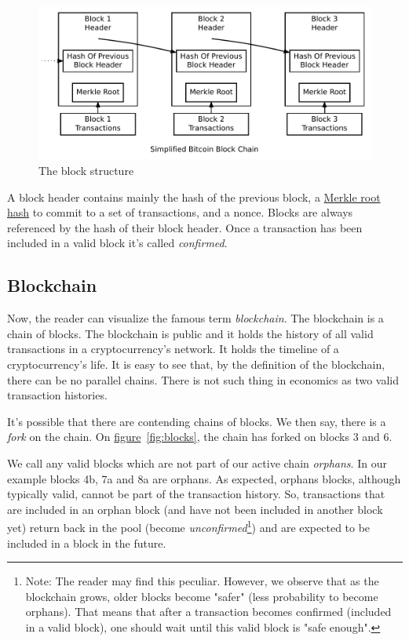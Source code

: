\begin{figure}[bh]
  \centering
  \includegraphics[width=0.9\columnwidth,keepaspectratio]{Images/block-structure.pdf}
  \caption{The block structure~\cite{Nakamoto_bitcoin:a}}
  \label{fig:block-structure}
\end{figure}

A block header contains mainly the hash of the previous block, a \hyperref[sec:merkle-trees]{Merkle root hash} to commit to a set of transactions, and a nonce. Blocks are always referenced by the hash of their block header. Once a transaction has been included in a valid block it's called \emph{confirmed}.

\subsection{\label{sec:blockchain}Blockchain}
Now, the reader can visualize the famous term \emph{blockchain}. The blockchain is a chain of blocks. The blockchain is public and it holds the history of all valid transactions in a cryptocurrency's network. It holds the timeline of a cryptocurrency's life. It is easy to see that, by the definition of the blockchain, there can be no parallel chains. There is not such thing in economics as two valid transaction histories.

It's possible that there are contending chains of blocks. We then say, there is a \emph{fork} on the chain. On \hyperref[fig:blocks]{figure}~\ref{fig:blocks}, the chain has forked on blocks 3 and 6.

We call any valid blocks which are not part of our active chain \emph{orphans}. In our example blocks 4b, 7a and 8a are orphans. As expected, orphans blocks, although typically valid, cannot be part of the transaction history. So, transactions that are included in an orphan block (and have not been included in another block yet) return back in the pool (become \emph{unconfirmed}\footnote{Note: The reader may find this peculiar. However, we observe that as the blockchain grows, older blocks become "safer" (less probability to become orphans). That means that after a transaction becomes confirmed (included in a valid block), one should wait until this valid block is "safe enough".}) and are expected to be included in a block in the future.

